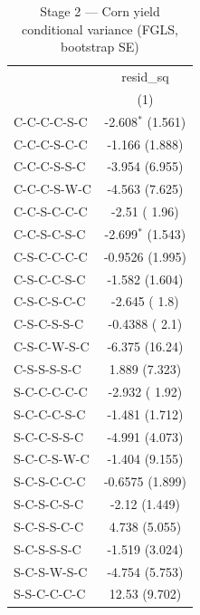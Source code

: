 
\begin{table}[H]
   \caption{\label{tab:corn_jp_var} Stage 2 --- Corn yield conditional variance (FGLS, bootstrap SE)}
   \bigskip
   \centering
   \begin{tabular}{lc}
      \toprule
                                       & resid\_sq\\   
                                       & (1)\\  
      \midrule 
      C-C-C-C-S-C                      & -2.608$^{*}$ (1.561)\\   
      C-C-C-S-C-C                      & -1.166 (1.888)\\   
      C-C-C-S-S-C                      & -3.954 (6.955)\\   
      C-C-C-S-W-C                      & -4.563 (7.625)\\   
      C-C-S-C-C-C                      & -2.51 ( 1.96)\\   
      C-C-S-C-S-C                      & -2.699$^{*}$ (1.543)\\   
      C-S-C-C-C-C                      & -0.9526 (1.995)\\   
      C-S-C-C-S-C                      & -1.582 (1.604)\\   
      C-S-C-S-C-C                      & -2.645 (  1.8)\\   
      C-S-C-S-S-C                      & -0.4388 (  2.1)\\   
      C-S-C-W-S-C                      & -6.375 (16.24)\\   
      C-S-S-S-S-C                      & 1.889 (7.323)\\   
      S-C-C-C-C-C                      & -2.932 ( 1.92)\\   
      S-C-C-C-S-C                      & -1.481 (1.712)\\   
      S-C-C-S-S-C                      & -4.991 (4.073)\\   
      S-C-C-S-W-C                      & -1.404 (9.155)\\   
      S-C-S-C-C-C                      & -0.6575 (1.899)\\   
      S-C-S-C-S-C                      & -2.12 (1.449)\\   
      S-C-S-S-C-C                      & 4.738 (5.055)\\   
      S-C-S-S-S-C                      & -1.519 (3.024)\\   
      S-C-S-W-S-C                      & -4.754 (5.753)\\   
      S-S-C-C-C-C                      & 12.53 (9.702)\\   

\end{tabular}
\end{table}
